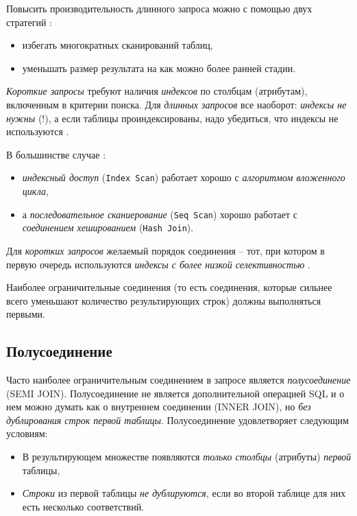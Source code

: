 \documentclass[%
	11pt,
	a4paper,
	utf8,
		]{article}
\begin{document}
Повысить производительность длинного запроса можно с помощью двух стратегий \cite[]{dombrovskaya:postgresql-2022}:
\begin{itemize}
	\item избегать многократных сканирований таблиц,
	
	\item уменьшать размер результата на как можно более ранней стадии.
\end{itemize}

\emph{Короткие запросы} требуют наличия \emph{индексов} по столбцам (атрибутам), включенным в критерии поиска. Для \emph{длинных запросов} все наоборот: \emph{индексы не нужны} (!), а если таблицы проиндексированы, надо убедиться, что индексы не используются \cite[]{dombrovskaya:postgresql-2022}.

В большинстве случае \cite[]{dombrovskaya:postgresql-2022}:
\begin{itemize}
	\color{blue}
	\item \emph{индексный доступ} (\verb|Index Scan|) работает хорошо с \emph{алгоритмом вложенного цикла},
	
	\item а \emph{последовательное сканиерование} (\verb|Seq Scan|) хорошо работает с \emph{соединением хешированием} (\verb|Hash Join|).
\end{itemize}

Для \emph{коротких запросов} желаемый порядок соединения -- тот, при котором в первую очередь используются \emph{индексы с более низкой селективностью} \cite[]{dombrovskaya:postgresql-2022}.


Наиболее ограничительные соединения (то есть соединения, которые сильнее всего уменьшают количество результирующих строк) должны выполняться первыми.

\subsection{Полусоединение}

Часто наиболее ограничительным соединением в запросе является \emph{полусоединение} (SEMI JOIN). Полусоединение не является дополнительной операцией SQL и о нем можно думать как о внутреннем соединении (INNER JOIN), но \emph{без дублирования строк первой таблицы}. Полусоединение удовлетворяет следующим условиям:
\begin{itemize}
	\item В результирующем множестве появляются \emph{только столбцы} (атрибуты) \emph{первой} таблицы,
	
	\item \emph{Строки} из первой таблицы \emph{не дублируются}, если во второй таблице для них есть несколько соответствий.
\end{itemize}
\end{document}
